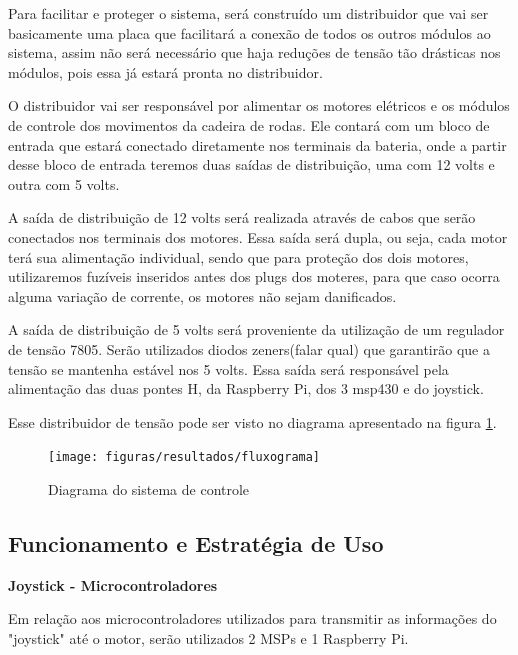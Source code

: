 Para facilitar e proteger o sistema, será construído um distribuidor que vai ser basicamente uma placa que facilitará a conexão de todos os outros módulos ao sistema, assim não será necessário que haja reduções de tensão tão drásticas nos módulos, pois essa já estará pronta no distribuidor.

O distribuidor vai ser responsável por alimentar os motores elétricos e os módulos de controle dos movimentos da cadeira de rodas. Ele contará com um bloco de entrada que estará conectado diretamente nos terminais da bateria, onde a partir desse bloco de entrada teremos duas saídas de distribuição, uma com 12 volts e outra com 5 volts.

A saída de distribuição de 12 volts será realizada através de cabos que serão conectados nos terminais dos motores. Essa saída será dupla, ou seja, cada motor terá sua alimentação individual, sendo que para proteção dos dois motores, utilizaremos fuzíveis inseridos antes dos plugs dos moteres, para que caso ocorra alguma variação de corrente, os motores não sejam danificados.

A saída de distribuição de 5 volts será proveniente da utilização de um regulador de tensão 7805. Serão utilizados diodos zeners(falar qual) que garantirão que a tensão se mantenha estável nos 5 volts. Essa saída será responsável pela alimentação das duas pontes H, da Raspberry Pi, dos 3 msp430 e do joystick.

Esse distribuidor de tensão pode ser visto no diagrama apresentado na figura \ref{fig:diagrama_controle}.

\begin{figure}[!htb]
	\centering
	\texttt{[image: figuras/resultados/fluxograma]}
	\caption{Diagrama do sistema de controle}
	\label{fig:diagrama_controle}
\end{figure}

\subsection{Funcionamento e Estratégia de Uso}

\textbf{Joystick - Microcontroladores}

Em relação aos microcontroladores utilizados para transmitir as informações do "joystick" até o motor, serão utilizados 2 MSPs e 1 Raspberry Pi.

